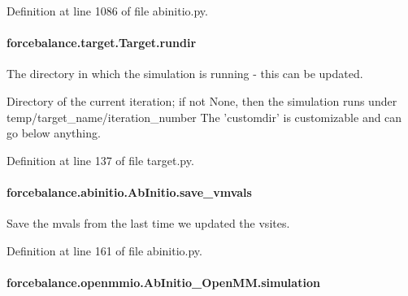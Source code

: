 Definition at line 1086 of file abinitio.\-py.

\hypertarget{classforcebalance_1_1target_1_1Target_a6872de5b2d4273b82336ea5b0da29c9e}{
\paragraph[{rundir}]{\setlength{\rightskip}{0pt plus 5cm}forcebalance.\-target.\-Target.\-rundir\hspace{0.3cm}{\ttfamily [inherited]}}}\label{classforcebalance_1_1target_1_1Target_a6872de5b2d4273b82336ea5b0da29c9e}


The directory in which the simulation is running -\/ this can be updated. 

Directory of the current iteration; if not None, then the simulation runs under temp/target\-\_\-name/iteration\-\_\-number The 'customdir' is customizable and can go below anything.

Definition at line 137 of file target.\-py.

\hypertarget{classforcebalance_1_1abinitio_1_1AbInitio_a22037bf43728fa45f387390005e0b131}{
\paragraph[{save\-\_\-vmvals}]{\setlength{\rightskip}{0pt plus 5cm}forcebalance.\-abinitio.\-Ab\-Initio.\-save\-\_\-vmvals\hspace{0.3cm}{\ttfamily [inherited]}}}\label{classforcebalance_1_1abinitio_1_1AbInitio_a22037bf43728fa45f387390005e0b131}


Save the mvals from the last time we updated the vsites. 



Definition at line 161 of file abinitio.\-py.

\hypertarget{classforcebalance_1_1openmmio_1_1AbInitio__OpenMM_ad999b78640bdd1bb9ea09f5ce82c95d7}{
\paragraph[{simulation}]{\setlength{\rightskip}{0pt plus 5cm}forcebalance.\-openmmio.\-Ab\-Initio\-\_\-\-Open\-M\-M.\-simulation}}\label{classforcebalance_1_1openmmio_1_1AbInitio__OpenMM_ad999b78640bdd1bb9ea09f5ce82c95d7}


